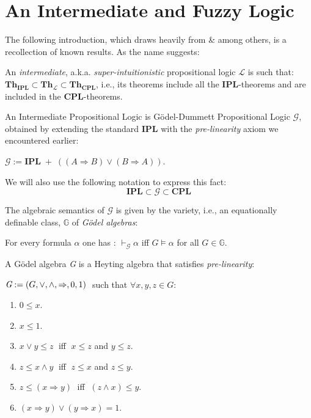 	
	\newpage
	
		\section{An Intermediate and Fuzzy Logic}
		\label{intermediate}
The following introduction, which draws heavily from \cite{fuzzy} \& \cite{firstorder} among others, is a recollection of known results.
		As the name suggests:
		
		\begin{definition}
			 An \emph{intermediate}, a.k.a. \emph{super-intuitionistic} propositional logic $\mathcal{L}$ is such that: $\textbf{Th}_{\textbf{IPL}} \subset \textbf{Th}_\mathcal{L} \subset \textbf{Th}_{\textbf{CPL}}$, i.e., its theorems include all the \textbf{IPL}-theorems and are included in the \textbf{CPL}-theorems.
			 
		\end{definition}
		
		An Intermediate Propositional Logic is Gödel-Dummett Propositional Logic $\mathcal{G}$, obtained by extending the standard \textbf{IPL} with the \emph{pre-linearity} axiom we encountered earlier:
		
		\begin{definition}
			 $\mathcal{G} := \textbf{IPL} \; + \; ((A \Rightarrow B) \lor (B \Rightarrow A))$.
		\end{definition}
	
	We will also use the following notation to express this fact:
	\begin{equation*}
		{\textbf{IPL}} \subset \mathcal{G} \subset {\textbf{CPL}}
	\end{equation*}
	
		The algebraic semantics of $\mathcal{G}$ is given by the variety, i.e., an equationally definable class, $\mathbb{G}$ of \emph{Gödel algebras}:
		
		\begin{remark} For every formula $\alpha$ one has : 
			$\vdash_{\mathcal{G}} \alpha$ iff $G \vDash \alpha$ for all $G \in \mathbb{G}$. 
		\end{remark}
		
		A Gödel algebra \emph{G} is a Heyting algebra that satisfies \emph{pre-linearity}:
	
		\begin{definition}
			 $\emph{G} := (G, \lor, \land, \Rightarrow, 0, 1) \;$ such that $ \forall x,y,z \in G :$ 
			 	\begin{enumerate}
			 	\item $0 \leq x$.
			 	\item $x \leq 1$.
			 	\item $x \lor y \leq z \;$ iff $\;x \leq z$ and $y \leq z$.
			 	\item $z \leq x \land y \;$ iff $\;z \leq x$ and $z \leq y$.
			 	\item $z \leq (x \Rightarrow y) \;$ iff $\; (z \land x) \leq y$.
			 	\item $(x \Rightarrow y) \lor (y \Rightarrow x) = 1$.
			 	\end{enumerate}  
		\end{definition}
	
